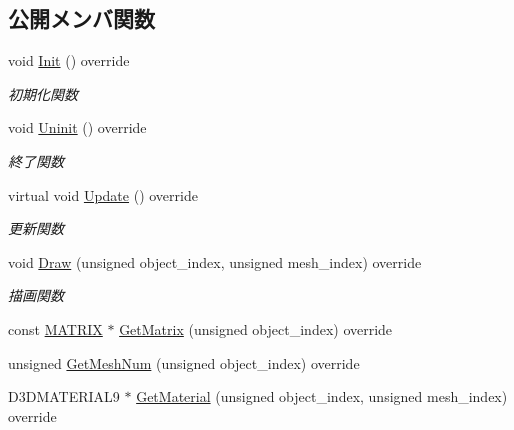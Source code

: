 \subsection*{公開メンバ関数}
\begin{DoxyCompactItemize}
\item 
void \mbox{\hyperlink{class_goal_draw_a3eb0a555fa2db9d2c1253018ea65796e}{Init}} () override
\begin{DoxyCompactList}\small\item\em 初期化関数 \end{DoxyCompactList}\item 
void \mbox{\hyperlink{class_goal_draw_a01318a0606848a3ca8ca7b7acbf4df24}{Uninit}} () override
\begin{DoxyCompactList}\small\item\em 終了関数 \end{DoxyCompactList}\item 
virtual void \mbox{\hyperlink{class_goal_draw_a6e003277ed44eb9c800a616b6acbcb20}{Update}} () override
\begin{DoxyCompactList}\small\item\em 更新関数 \end{DoxyCompactList}\item 
void \mbox{\hyperlink{class_goal_draw_a554c826d7a4534ee489dfe18edf7ee0e}{Draw}} (unsigned object\+\_\+index, unsigned mesh\+\_\+index) override
\begin{DoxyCompactList}\small\item\em 描画関数 \end{DoxyCompactList}\item 
const \mbox{\hyperlink{_vector3_d_8h_a032295cd9fb1b711757c90667278e744}{M\+A\+T\+R\+IX}} $\ast$ \mbox{\hyperlink{class_goal_draw_a50fa9ceaaecdff9910e0f91e65ad9e95}{Get\+Matrix}} (unsigned object\+\_\+index) override
\item 
unsigned \mbox{\hyperlink{class_goal_draw_a7f30c7a4325668eebd8730ad2bea1ad8}{Get\+Mesh\+Num}} (unsigned object\+\_\+index) override
\item 
D3\+D\+M\+A\+T\+E\+R\+I\+A\+L9 $\ast$ \mbox{\hyperlink{class_goal_draw_a47baf72f8c1c961176610f161069b8d1}{Get\+Material}} (unsigned object\+\_\+index, unsigned mesh\+\_\+index) override
\end{DoxyCompactItemize}
